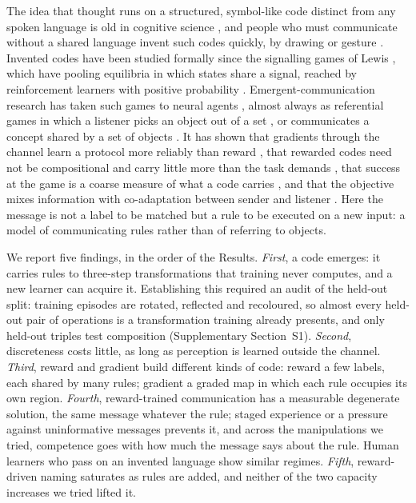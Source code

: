 \documentclass{nature}
\begin{document}
The idea that thought runs on a structured, symbol-like code distinct from any spoken language is old in
cognitive science \cite{fodor1975,piantadosi2016,quiltydunn2023,dehaene2022}, and people who must communicate
without a shared language invent such codes quickly, by drawing or gesture \cite{galantucci2005,fay2010,motamedi2019}.
Invented codes have been studied formally since the signalling games of Lewis \cite{lewis1969}, which have pooling
equilibria in which states share a signal, reached by reinforcement learners with positive probability
\cite{skyrms2010,huttegger2010,barrett2009}. Emergent-communication research has taken such games to neural agents
\cite{lazaridou2020}, almost always as referential games in which a listener picks an object out of a set
\cite{lazaridou2017,havrylov2017,chaabouni2019,chaabouni2020,ren2020,li2019}, or communicates a concept shared by a
set of objects \cite{mu2021}. It has shown that gradients through the channel learn a protocol more reliably than
reward \cite{foerster2016}, that rewarded codes need not be compositional \cite{kottur2017} and carry little more
than the task demands \cite{kharitonov2020}, that success at the game is a coarse measure of what a code carries
\cite{lowe2019}, and that the objective mixes information with co-adaptation between sender and listener
\cite{rita2022}. Here the message is not a label to be matched but a rule to be executed on a new input: a model of
communicating rules rather than of referring to objects.

We report five findings, in the order of the Results. \emph{First}, a code emerges: it carries rules to
three-step transformations that training never computes, and a new learner can acquire it. Establishing this
required an audit of the held-out split: training episodes are rotated, reflected and recoloured, so almost every
held-out pair of operations is a transformation training already presents, and only held-out triples test
composition (Supplementary Section~S1). \emph{Second}, discreteness costs little, as long as perception is learned
outside the channel. \emph{Third}, reward and gradient build different kinds of code: reward a few labels, each
shared by many rules; gradient a graded map in which each rule occupies its own region. \emph{Fourth},
reward-trained communication has a measurable degenerate solution, the same message whatever the rule; staged
experience or a pressure against uninformative messages prevents it, and across the manipulations we tried,
competence goes with how much the message says about the rule. Human learners who pass on an invented language
show similar regimes. \emph{Fifth}, reward-driven naming saturates as rules are added, and neither of the two
capacity increases we tried lifted it.
\end{document}
